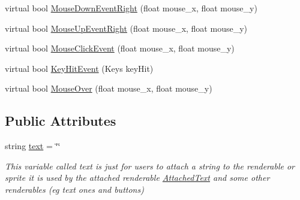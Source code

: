 \begin{DoxyCompactItemize}
\item 
virtual bool \mbox{\hyperlink{class_r_c___framework_1_1_r_c___renderable_a827d6c2bde928d9337b341f2ff60ac48}{Mouse\+Down\+Event\+Right}} (float mouse\+\_\+x, float mouse\+\_\+y)
\item 
virtual bool \mbox{\hyperlink{class_r_c___framework_1_1_r_c___renderable_afd14f09a6249144be45af3dcb9ebe1b2}{Mouse\+Up\+Event\+Right}} (float mouse\+\_\+x, float mouse\+\_\+y)
\item 
virtual bool \mbox{\hyperlink{class_r_c___framework_1_1_r_c___renderable_af929e80b7c88bb21b01358f47ad36a64}{Mouse\+Click\+Event}} (float mouse\+\_\+x, float mouse\+\_\+y)
\item 
virtual bool \mbox{\hyperlink{class_r_c___framework_1_1_r_c___renderable_a826da9b07316c475186e4c2f00648827}{Key\+Hit\+Event}} (Keys key\+Hit)
\item 
virtual bool \mbox{\hyperlink{class_r_c___framework_1_1_r_c___renderable_abd55ea96d88d7bd2207e3a4ede1f1a05}{Mouse\+Over}} (float mouse\+\_\+x, float mouse\+\_\+y)
\end{DoxyCompactItemize}
\subsection*{Public Attributes}
\begin{DoxyCompactItemize}
\item 
string \mbox{\hyperlink{class_r_c___framework_1_1_r_c___renderable_a255c5d9294a719e56855890f3535d129}{text}} = \char`\"{}\char`\"{}
\begin{DoxyCompactList}\small\item\em This variable called text is just for users to attach a string to the renderable or sprite it is used by the attached renderable \mbox{\hyperlink{class_r_c___framework_1_1_attached_text}{Attached\+Text}} and some other renderables (eg text ones and buttons) \end{DoxyCompactList}\end{DoxyCompactItemize}
